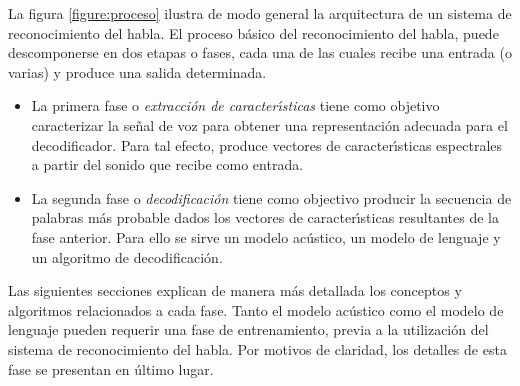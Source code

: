 La figura \ref{figure:proceso} ilustra de modo general la arquitectura de un sistema de reconocimiento del habla.
El proceso b\'asico del reconocimiento del habla, puede descomponerse en dos etapas o fases, cada una de las cuales
recibe una entrada (o varias) y produce una salida determinada.

\begin{itemize}
\item La primera fase o \emph{extracci\'on de caracter{\'\i}sticas} tiene como objetivo caracterizar la se\~nal
de voz para obtener una representaci\'on adecuada para el decodificador. Para tal efecto, produce vectores de
caracter{\'\i}sticas espectrales a partir del sonido que recibe como entrada.
\item La segunda fase o \emph{decodificaci\'on} tiene como objectivo producir la secuencia de palabras m\'as probable
dados los vectores de caracter{\'\i}sticas resultantes de la fase anterior. Para ello se sirve un modelo ac\'ustico, un
modelo de lenguaje y un algoritmo de decodificaci\'on.
\end{itemize}

Las siguientes secciones explican de manera m\'as detallada los conceptos y algoritmos relacionados a cada fase.
Tanto el modelo ac\'ustico como el modelo de lenguaje pueden requerir una fase de entrenamiento, 
previa a la utilizaci\'on del sistema de reconocimiento del habla.
Por motivos de claridad, los detalles de esta fase se presentan en \'ultimo lugar.



